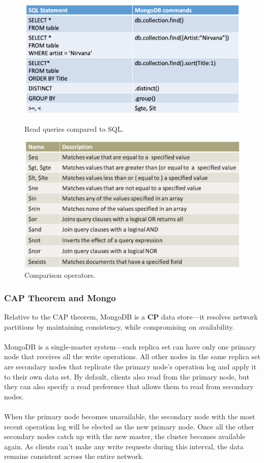 \documentclass[10pt,a4paper]{article}
\newcommand{\nline}{\\~\\}
\begin{document}
\begin{figure}[ht!]
\centering
\begin{minipage}{.5\textwidth}
  \centering
  \includegraphics[width=.8\linewidth]{images/mongodb-read-mapping}
    \caption{Read queries compared to SQL.}
\end{minipage}%
\begin{minipage}{.5\textwidth}
  \centering
  \includegraphics[width=.8\linewidth]{images/mongodb-comparison-op}
  \caption{Comparison operators.}
\end{minipage}
\end{figure} 
 
 \subsubsection{CAP Theorem and Mongo}
 Relative to the CAP theorem, MongoDB is a \textbf{CP} data store—it resolves network partitions by maintaining consistency, while compromising on availability.
 \nline
 MongoDB is a single-master system—each replica set can have only one primary node that receives all the write operations. All other nodes in the same replica set are secondary nodes that replicate the primary node's operation log and apply it to their own data set. By default, clients also read from the primary node, but they can also specify a read preference that allows them to read from secondary nodes.
 \nline
 When the primary node becomes unavailable, the secondary node with the most recent operation log will be elected as the new primary node. Once all the other secondary nodes catch up with the new master, the cluster becomes available again. As clients can't make any write requests during this interval, the data remains consistent across the entire network.
 \pagebreak
\end{document}
